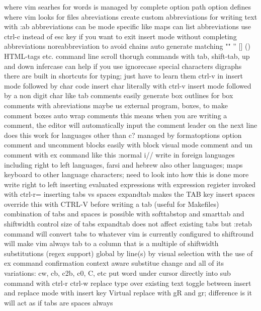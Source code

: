 \documentclass[12pt]{book}
\begin{document}
      where vim searhes for words is managed by complete option
      path option defines where vim looks for files
      abreviations
        create custom abbreviations for writing text with :ab
        abbreviations can be mode specific like maps
        can list abbreviations
        use ctrl-c instead of esc key if you want to exit insert mode without completing abbreviations
        noreabbreviation to avoid chains
      auto generate matching "" '' [] {} () HTML-tags etc.
      command line
        scroll thorugh commands with tab, shift-tab, up and down
      infercase can help if you use ignorecase
    special characters
      digraphs
        there are built in shortcuts for typing; just have to learn them
      ctrl-v in insert mode followed by char code
      insert char literally with ctrl-v insert mode followed by a non digit char like tab
    comments
      easily generate box outlines for box comments with abreviations
      maybe us external program, boxes, to make comment boxes
      auto wrap comments
        this means when you are writing a comment, the editor will automatically input the comment leader on the next line
        does this work for languages other than c?
        managed by formatoptions option
      comment and uncomment blocks easily with block visual mode
      comment and un comment with ex command like this :normal i//
    write in foreign languages including right to left languages, farsi and hebrew
      also other languages; maps keyboard to other language characters; need to look into how this is done more
      write right to left
  inserting evaluated expressions with expression register invoked with ctrl-r=
  inserting tabs vs spaces
    expandtab makes the TAB key insert spaces
    override this with CTRL-V before writing a tab (useful for Makefiles)
    combination of tabs and spaces is possible with softtabstop and smarttab and shiftwidth
    control size of tabs
    expandtab does not affect existing tabs but :retab command will convert tabs to whatever vim is currently configured to
    shiftround will make vim always tab to a column that is a multiple of shiftwidth
  substitutions (regex support)
    global
    by line(s)
    by visual selection with the use of ex command
    confirmation
    context aware substitue
    change and all of its variations: cw, cb, c2b, c0, C, etc
    put word under cursor directly into sub command with ctrl-r ctrl-w
    replace
      type over existing text
      toggle between insert and replace mode with insert key
      Virtual replace with gR and gr; difference is it will act as if tabs are spaces always
\end{document}
